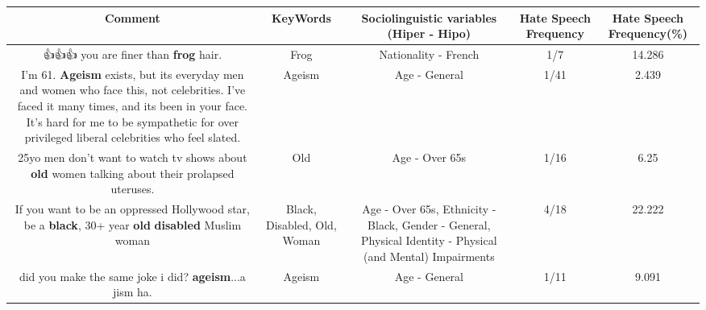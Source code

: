 \documentclass[11pt]{article}
\newlength\mylength
\begin{document}
\begin{center}
\setlength\mylength{\dimexpr\textwidth - 1\arrayrulewidth - 50\tabcolsep}
\begin{longtable}{|C{.65\mylength}|C{.30\mylength}|C{.12\mylength}|C{.12\mylength}|C{.12\mylength}|}
\hline
\textbf{Comment} & \textbf{KeyWords} & \textbf{Sociolinguistic variables (Hiper - Hipo)}  & \textbf{Hate Speech Frequency} & \textbf{Hate Speech Frequency(\%)} \\
\hline{}\small 👍👍👍 you are finer than \textbf{frog} hair.\normalsize   & Frog & Nationality - French & 1/7 & 14.286 \\  \hline
  \small I'm 61. \textbf{Ageism} exists, but its everyday men and women who face this, not celebrities. I've faced it many times, and its been in your face. It's hard for me to be sympathetic for over privileged liberal celebrities who feel slated.\normalsize   & Ageism & Age - General & 1/41 & 2.439 \\  \hline
  \small 25yo men don't want to watch tv shows about \textbf{old} women talking about their prolapsed uteruses.\normalsize   & Old & Age - Over 65s & 1/16 & 6.25 \\  \hline
  \small If you want to be an oppressed Hollywood star, be a \textbf{black}, 30+ year \textbf{old} \textbf{disabled} Muslim woman\normalsize   & Black, Disabled, Old, Woman & Age - Over 65s, Ethnicity - Black, Gender - General, Physical Identity - Physical (and Mental) Impairments & 4/18 & 22.222 \\  \hline
  \small did you make the same joke i did? \textbf{ageism}...a jism ha.\normalsize   & Ageism & Age - General & 1/11 & 9.091 \\  \hline

\end{longtable}
\end{center}
\end{document}
